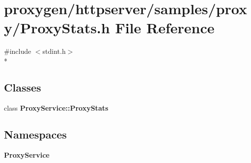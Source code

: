 \section{proxygen/httpserver/samples/proxy/\+Proxy\+Stats.h File Reference}
\label{ProxyStats_8h}
{\ttfamily \#include $<$stdint.\+h$>$}\\*
\subsection*{Classes}
\begin{DoxyCompactItemize}
\item 
class {\bf Proxy\+Service\+::\+Proxy\+Stats}
\end{DoxyCompactItemize}
\subsection*{Namespaces}
\begin{DoxyCompactItemize}
\item 
 {\bf Proxy\+Service}
\end{DoxyCompactItemize}
